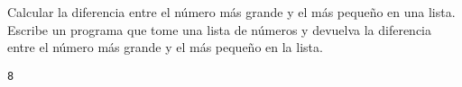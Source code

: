 \begin{exercise}
Calcular la diferencia entre el número más grande y el más pequeño en
una lista. Escribe un programa que tome una lista de números y
devuelva la diferencia entre el número más grande y el más pequeño en
la lista.

\begin{Shaded}
\begin{Highlighting}[]
 

\OperatorTok{=} \NormalTok{(}\OperatorTok{\textgreater{}}
\OperatorTok{=} \NormalTok{(}\OperatorTok{\textless{}}
    \OperatorTok{{-}}

\OperatorTok{=}\NormalTok{ [}\NormalTok{, }\NormalTok{, }\NormalTok{, }\NormalTok{, }\NormalTok{]}
\OperatorTok{=}
\end{Highlighting}
\end{Shaded}

\begin{verbatim}
8

\end{verbatim}
\end{exercise}


